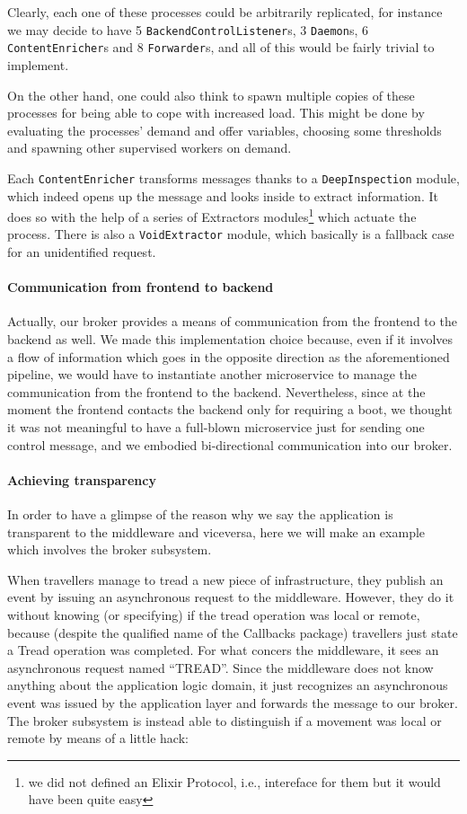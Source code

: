 Clearly, each one of these processes could be arbitrarily replicated, for
instance we may decide to have 5 \texttt{BackendControlListener}s, 3
\texttt{Daemon}s, 6 \texttt{ContentEnricher}s and 8 \texttt{Forwarder}s, and
all of this would be fairly trivial to implement.

On the other hand, one could also think to spawn multiple copies of these
processes for being able to cope with increased load.
This might be done by evaluating the processes' demand and offer variables,
choosing some thresholds and spawning other supervised workers on demand.

Each \texttt{ContentEnricher} transforms messages thanks to a
\texttt{DeepInspection} module, which indeed opens up the message and looks
inside to extract information.
It does so with the help of a series of Extractors modules\footnote{we did not
defined an Elixir Protocol, i.e., intereface for them but it would have been
quite easy} which actuate the process. There is also a \texttt{VoidExtractor}
module, which basically is a fallback case for an unidentified request.

\paragraph{Communication from frontend to backend}
Actually, our broker provides a means of communication from the frontend to
the backend as well.
We made this implementation choice because, even if it involves a flow of
information which goes in the opposite direction as the aforementioned
pipeline, we would have to instantiate another microservice to manage the
communication from the frontend to the backend.
Nevertheless, since at the moment the frontend contacts the backend only for
requiring a boot, we thought it was not meaningful to have a full-blown
microservice just for sending one control message, and we embodied
bi-directional communication into our broker.

\paragraph{Achieving transparency}
In order to have a glimpse of the reason why we say the application is
transparent to the middleware and viceversa, here we will make an example which
involves the broker subsystem.

When travellers manage to tread a new piece of infrastructure, they publish an
event by issuing an asynchronous request to the middleware. However, they do it
without knowing (or specifying) if the tread operation was local or remote,
because (despite the qualified name of the Callbacks package) travellers just
state a Tread operation was completed.
For what concers the middleware, it sees an asynchronous request named
``TREAD''. Since the middleware does not know anything about the application
logic domain, it just recognizes an asynchronous event was issued by the
application layer and forwards the message to our broker.
The broker subsystem is instead able to distinguish if a movement was local or
remote by means of a little hack:

